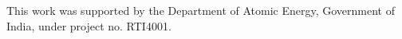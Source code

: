 This work was supported by the Department of Atomic Energy, Government of India, under project no. RTI4001.